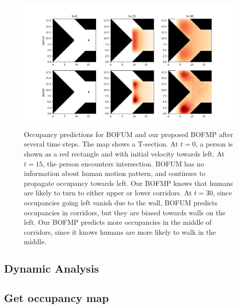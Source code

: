 \begin{figure}[ht]
  \centering
    \includegraphics[width=\textwidth]{figures/idea.png}
    \caption{Occupancy predictions for BOFUM and our proposed BOFMP after several time steps. The map shows a T-section. At $t=0$, a person is shown as a red rectangle and with initial velocity towards left. At $t=15$, the person encounters intersection. BOFUM has no information about human motion pattern, and continues to propagate occupancy towards left. Our BOFMP knows that humans are likely to turn to either upper or lower corridors. At $t=30$, since occupancies going left vanish due to the wall, BOFUM predicts occupancies in corridors, but they are biased towards walls on the left. Our BOFMP predicts more occupancies in the middle of corridors, since it knows humans are more likely to walk in the middle.}
    \label{fig:idea}
\end{figure}

\subsection{Dynamic Analysis}
\subsection{Get occupancy map}

